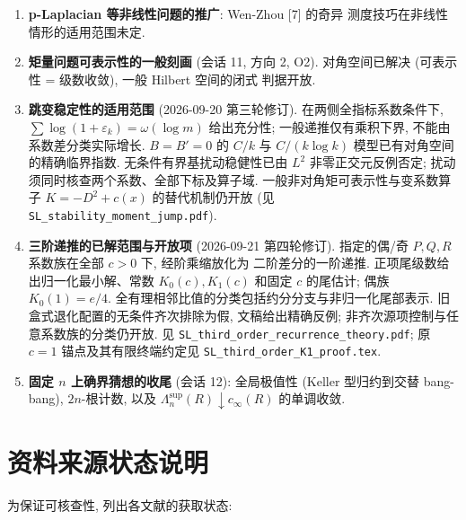 \documentclass[UTF8]{ctexart}
\begin{document}
\begin{enumerate}
        正交补主判据 $V\cap Q^\perp=\{0\}$ 保留. 旧对角游程分类与
        独立反例仍按原条件保存在冻结 run 中, 本轮不把其它历史分支重新认证.
        第五轮 $s=2$ 的余有限两迹分类不受此次反例影响, 也不因完整族的
        分数窗补证而自动扩展到其它 $s$. 一般非对角 O1'/O1'LD 的矩可表示性
        与实际成员条件仍开放. 原 Krein O3 的 $3/2\le s<2$ 已被覆盖,
        一般边界约束空间则须逐案检验.
        \item \textbf{p-Laplacian 等非线性问题的推广}: Wen-Zhou [7] 的奇异
		测度技巧在非线性情形的适用范围未定.
	\item \textbf{矩量问题可表示性的一般刻画} (会话 11, 方向 2, O2).
		对角空间已解决 (可表示性 = 级数收敛), 一般 Hilbert 空间的闭式
		判据开放.
	\item \textbf{跳变稳定性的适用范围} (2026-09-20 第三轮修订).
		在两侧全指标系数条件下, $\sum\log(1+\varepsilon_k)=\omega(\log m)$
		给出充分性; 一般递推仅有乘积下界, 不能由系数差分类实际增长.
		$B=B'=0$ 的 $C/k$ 与 $C/(k\log k)$ 模型已有对角空间的精确临界指数.
		无条件有界基扰动稳健性已由 $L^2$ 非零正交元反例否定;
		扰动须同时核查两个系数、全部下标及算子域.
		一般非对角矩可表示性与变系数算子 $K=-D^2+c(x)$ 的替代机制仍开放
		(见 \texttt{SL\_stability\_moment\_jump.pdf}).
	\item \textbf{三阶递推的已解范围与开放项} (2026-09-21 第四轮修订).
		指定的偶/奇 $P,Q,R$ 系数族在全部 $c>0$ 下, 经阶乘缩放化为
		二阶差分的一阶递推. 正项尾级数给出归一化最小解、常数
		$K_0(c),K_1(c)$ 和固定 $c$ 的尾估计; 偶族 $K_0(1)=e/4$.
		全有理相邻比值的分类包括约分分支与非归一化尾部表示.
		旧盒式退化配置的无条件齐次排除为假, 文稿给出精确反例;
		非齐次源项控制与任意系数族的分类仍开放.
		见 \texttt{SL\_third\_order\_recurrence\_theory.pdf};
		原 $c=1$ 锚点及其有限终端约定见
		\texttt{SL\_third\_order\_K1\_proof.tex}.
	\item \textbf{固定 $n$ 上确界猜想的收尾} (会话 12): 全局极值性
		(Keller 型归约到交替 bang-bang), $2n$-根计数, 以及
		$\Lambda_n^{\sup}(R)\downarrow c_\infty(R)$ 的单调收敛.
\end{enumerate}


\section{资料来源状态说明}

为保证可核查性, 列出各文献的获取状态:
\end{document}
